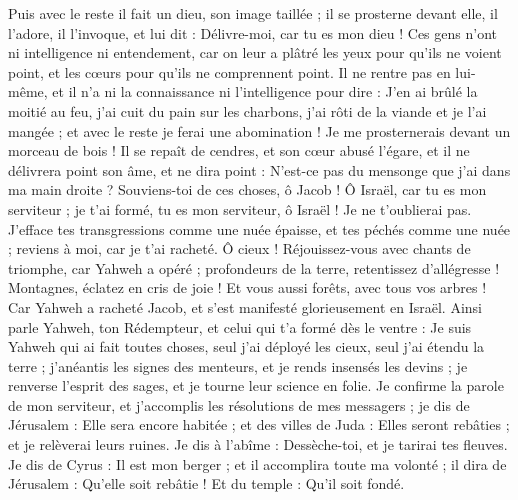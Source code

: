 \begin{multicols}{2}
Puis avec le reste il fait un dieu, son image taillée ; il se prosterne devant elle, il l'adore, il l'invoque, et lui dit : Délivre-moi, car tu es mon dieu !
Ces gens n'ont ni intelligence ni entendement, car on leur a plâtré les yeux pour qu'ils ne voient point, et les cœurs pour qu'ils ne comprennent point.
Il ne rentre pas en lui-même, et il n'a ni la connaissance ni l'intelligence pour dire : J'en ai brûlé la moitié au feu, j'ai cuit du pain sur les charbons, j'ai rôti de la viande et je l'ai mangée ; et avec le reste je ferai une abomination ! Je me prosternerais devant un morceau de bois !
Il se repaît de cendres, et son cœur abusé l'égare, et il ne délivrera point son âme, et ne dira point : N'est-ce pas du mensonge que j'ai dans ma main droite ?
Souviens-toi de ces choses, ô Jacob ! Ô Israël, car tu es mon serviteur ; je t'ai formé, tu es mon serviteur, ô Israël ! Je ne t'oublierai pas.
J'efface tes transgressions comme une nuée épaisse, et tes péchés comme une nuée ; reviens à moi, car je t'ai racheté.
Ô cieux ! Réjouissez-vous avec chants de triomphe, car Yahweh a opéré ; profondeurs de la terre, retentissez d'allégresse ! Montagnes, éclatez en cris de joie ! Et vous aussi forêts, avec tous vos arbres ! Car Yahweh a racheté Jacob, et s'est manifesté glorieusement en Israël.
Ainsi parle Yahweh, ton Rédempteur, et celui qui t'a formé dès le ventre : Je suis Yahweh qui ai fait toutes choses, seul j'ai déployé les cieux, seul j'ai étendu la terre ;
j'anéantis les signes des menteurs, et je rends insensés les devins ; je renverse l'esprit des sages, et je tourne leur science en folie.
Je confirme la parole de mon serviteur, et j'accomplis les résolutions de mes messagers ; je dis de Jérusalem : Elle sera encore habitée ; et des villes de Juda : Elles seront rebâties ; et je relèverai leurs ruines.
Je dis à l'abîme : Dessèche-toi, et je tarirai tes fleuves.
Je dis de Cyrus : Il est mon berger ; et il accomplira toute ma volonté ; il dira de Jérusalem : Qu'elle soit rebâtie ! Et du temple : Qu'il soit fondé.

\end{multicols}
